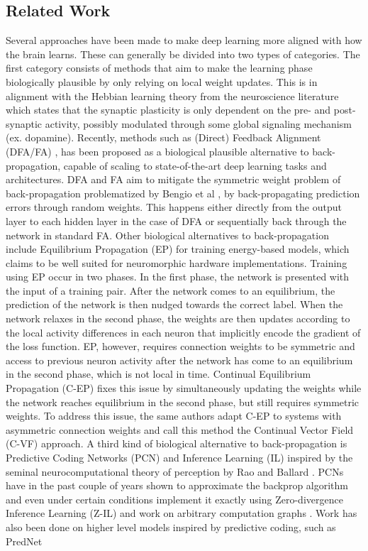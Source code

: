 \documentclass[a4paper,11pt]{article} %
\begin{document}
\subsection{Related Work}
Several approaches have been made to make deep learning more aligned with how the brain learns. These can generally be divided into two types of categories. The first category consists of methods that aim to make the learning phase biologically plausible by only relying on local weight updates. This is in alignment with the Hebbian learning theory \cite{hebb1949} from the neuroscience literature which states that the synaptic plasticity is only dependent on the pre- and post-synaptic activity, possibly modulated through some global signaling mechanism (ex. dopamine). Recently, methods such as (Direct) Feedback Alignment (DFA/FA) \cite{noekland2016direct} \cite{lillicrap2014random}, has been proposed as a biological plausible alternative to back-propagation, capable of scaling to state-of-the-art deep learning tasks and architectures. DFA and FA aim to mitigate the symmetric weight problem of back-propagation problematized by Bengio et al \cite{BengioLBL15}, by back-propagating prediction errors through random weights. This happens either directly from the output layer to each hidden layer in the case of DFA or sequentially back through the network in standard FA. Other biological alternatives to back-propagation include Equilibrium Propagation (EP) \cite{EqProp} for training energy-based models, which claims to be well suited for neuromorphic hardware implementations. Training using EP occur in two phases. In the first phase, the network is presented with the input of a training pair. After the network comes to an equilibrium, the prediction of the network is then nudged towards the correct label. When the network relaxes in the second phase, the weights are then updates according to the local activity differences in each neuron that implicitly encode the gradient of the loss function. EP, however, requires connection weights to be symmetric and access to previous neuron activity after the network has come to an equilibrium in the second phase, which is not local in time. Continual Equilibrium Propagation (C-EP) \cite{ContinualEqProp} fixes this issue by simultaneously updating the weights while the network reaches equilibrium in the second phase, but still requires symmetric weights. To address this issue, the same authors adapt C-EP to systems with asymmetric connection weights and call this method the Continual Vector Field (C-VF) approach. A third kind of biological alternative to back-propagation is Predictive Coding Networks (PCN) and Inference Learning (IL) \cite{predcoding} inspired by the seminal neurocomputational theory of perception by Rao and Ballard \cite{raoballard1999}. PCNs have in the past couple of years shown to approximate the backprop algorithm and even under certain conditions implement it exactly using Zero-divergence Inference Learning (Z-IL) \cite{PredictiveCodingNetworks} and work on arbitrary computation graphs \cite{salvatori2021reverse} \cite{milladge2020predictive}. Work has also been done on higher level models inspired by predictive coding, such as PredNet 
\end{document}
